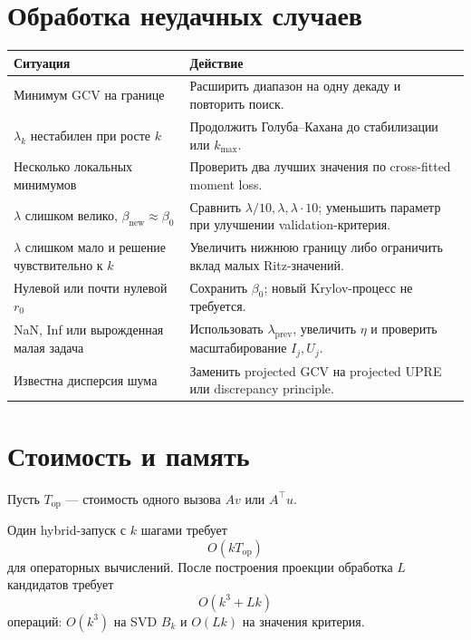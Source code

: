 \documentclass[11pt,a4paper]{article}
\begin{document}
\section{Обработка неудачных случаев}

\begin{center}
\begin{tabular}{>{\raggedright\arraybackslash}p{}
                >{\raggedright\arraybackslash}p{}}
\toprule
Ситуация & Действие\\
\midrule
Минимум GCV на границе &
Расширить диапазон на одну декаду и повторить поиск.\\

\(\lambda_k\) нестабилен при росте \(k\) &
Продолжить Голуба--Кахана до стабилизации или \(k_{\max}\).\\

Несколько локальных минимумов &
Проверить два лучших значения по cross-fitted moment loss.\\

\(\lambda\) слишком велико, \(\beta_{\mathrm{new}}\approx\beta_0\) &
Сравнить \(\lambda/10,\lambda,\lambda\cdot10\); уменьшить параметр при
улучшении validation-критерия.\\

\(\lambda\) слишком мало и решение чувствительно к \(k\) &
Увеличить нижнюю границу либо ограничить вклад малых Ritz-значений.\\

Нулевой или почти нулевой \(r_0\) &
Сохранить \(\beta_0\); новый Krylov-процесс не требуется.\\

NaN, Inf или вырожденная малая задача &
Использовать \(\lambda_{\mathrm{prev}}\), увеличить \(\eta\) и проверить
масштабирование \(I_j,U_j\).\\

Известна дисперсия шума &
Заменить projected GCV на projected UPRE или discrepancy principle.\\
\bottomrule
\end{tabular}
\end{center}

\section{Стоимость и память}

Пусть \(T_{\mathrm{op}}\) --- стоимость одного вызова \(Av\) или \(A^\top u\).

Один hybrid-запуск с \(k\) шагами требует
\[
    O(kT_{\mathrm{op}})
\]
для операторных вычислений. После построения проекции обработка \(L\) кандидатов
требует
\[
    O(k^3+Lk)
\]
операций: \(O(k^3)\) на SVD \(B_k\) и \(O(Lk)\) на значения критерия.
\end{document}
